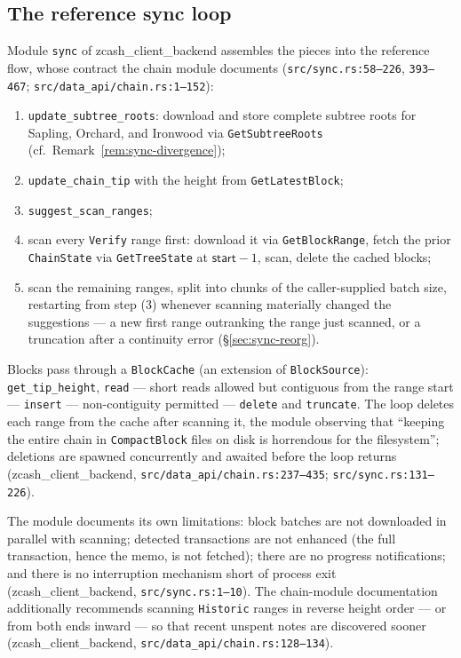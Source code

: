 \documentclass[11pt,a4paper]{article}
\theoremstyle{definition}
\begin{document}
\subsection{The reference sync loop}\label{sec:sync-loop}

Module \texttt{sync} of \textsf{zcash\_client\_backend} assembles the
pieces into the reference flow, whose contract the chain module documents
(\texttt{src/sync.rs:58--226}, \texttt{393--467};
\texttt{src/data\_api/}\allowbreak\texttt{chain.rs:1--152}):
\begin{enumerate}[label=(\arabic*)]
\item[(1--2)] \texttt{update\_subtree\_roots}: download and store complete
  subtree roots for Sapling, Orchard, and Ironwood via
  \texttt{GetSubtreeRoots} (cf.\ Remark~\ref{rem:sync-divergence});
\item[(3--4)] \texttt{update\_chain\_tip} with the height from
  \texttt{GetLatestBlock};
\item[(5)] \texttt{suggest\_scan\_ranges};
\item[(6)] scan every \texttt{Verify} range first: download it via
  \texttt{GetBlockRange}, fetch the prior \texttt{ChainState} via
  \texttt{GetTreeState} at $\mathsf{start} - 1$, scan, delete the cached
  blocks;
\item[(7)] scan the remaining ranges, split into chunks of the
  caller-supplied batch size, restarting from step (3) whenever scanning
  materially changed the suggestions --- a new first range outranking the
  range just scanned, or a truncation after a continuity error
  (\S\ref{sec:sync-reorg}).
\end{enumerate}

Blocks pass through a \texttt{BlockCache} (an extension of
\texttt{BlockSource}): \texttt{get\_tip\_height}, \texttt{read} --- short
reads allowed but contiguous from the range start --- \texttt{insert} ---
non-contiguity permitted --- \texttt{delete} and \texttt{truncate}. The
loop deletes each range from the cache after scanning it, the module
observing that ``keeping the entire chain in \texttt{CompactBlock} files on
disk is horrendous for the filesystem''; deletions are spawned concurrently
and awaited before the loop returns
(\textsf{zcash\_client\_backend}, \texttt{src/data\_api/chain.rs:237--435};
\texttt{src/sync.rs:131--226}).

The module documents its own limitations: block batches are not downloaded
in parallel with scanning; detected transactions are not enhanced (the full
transaction, hence the memo, is not fetched); there are no progress
notifications; and there is no interruption mechanism short of process
exit (\textsf{zcash\_client\_backend}, \texttt{src/sync.rs:1--10}). The
chain-module
documentation additionally recommends scanning \texttt{Historic} ranges in
reverse height order --- or from both ends inward --- so that recent
unspent notes are discovered sooner
(\textsf{zcash\_client\_backend}, \texttt{src/data\_api/chain.rs:128--134}).
\end{document}
